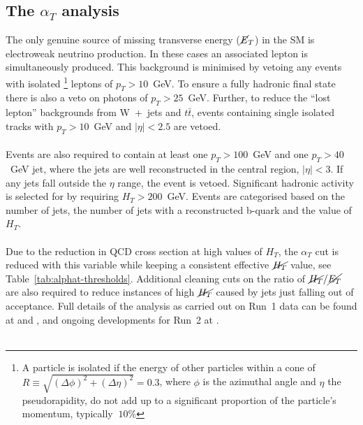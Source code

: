 \subsection{The \boldmath $\alpha_T$ analysis}

The only genuine source of missing transverse energy ($\cancel{E}_T$) in the SM is electroweak neutrino production. In these cases an associated lepton is simultaneously produced. This background is minimised by vetoing any events with isolated \footnote{A particle is isolated if the energy of other particles within a cone of $R\equiv\sqrt{(\Delta\phi)^2+(\Delta\eta)^2}=0.3$, where $\phi$ is the azimuthal angle and $\eta$ the pseudorapidity, do not add up to a significant proportion of the particle's momentum, typically $~10$\%} leptons of $p_T>10$~GeV. To ensure a fully hadronic final state there is also a veto on photons of $p_T>25$~GeV. Further, to reduce the ``lost lepton'' backgrounds from W~+~jets 
and $t\bar{t}$, events containing single isolated tracks with $p_T >10$~GeV and $|\eta| < 2.5$ are vetoed.
\\\\
Events are also required to contain at least one $p_T>100$~GeV and one $p_T>40$~GeV jet, where the jets are well reconstructed in the central region, $|\eta|<3$. If any jets fall outside the $\eta$ range, the event is vetoed. Significant hadronic activity is selected for by requiring $H_T>200$~GeV. Events are categorised based on the number of jets, the number of jets with a reconstructed b-quark and the value of $H_T$. 
\\\\
Due to the reduction in QCD cross section at high values of $H_T$, the $\alpha_T$ cut is reduced with this variable while keeping a consistent effective $\cancel{H_T}$ value, see Table~\ref{tab:alphat-thresholds}. Additional cleaning cuts on the ratio of $\cancel{H_T}/\cancel{E_T}$ are also required to reduce instances of high $\cancel{H_T}$ caused by jets just falling out of acceptance. Full details of the analysis as carried out on Run~1 data can be found at \cite{AlphaT8TeVChatrchyan:2013lya} and \cite{AlphaT_7TeV_PRLChatrchyan:2011zy}, and ongoing developments for Run~2 at \cite{AN-15-004}.
\\\\

